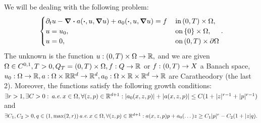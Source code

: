 \documentclass{article}
\begin{document}
We will be dealing with the following problem:
\[
	\begin{cases}
		\partial_t u - \divergence{a\qty(\vdot, u, \grad u)}+ a_0\qty(\vdot, u, \grad u) = f &\, \text{in} \, (0,T) \times \Omega, \\
		u = u_0, &\, \text{on} \, \{0\} \times \Omega, \\
		u = 0, &\, \text{on} \, (0,T) \times \partial \Omega
	\end{cases}.
\]
The unknown is the function $u: \qty(0,T) \times \Omega \to {\mathbb R},$ and we are given $\Omega \in C^{0,1}, T>0, Q_T = (0,T) \times \Omega, f: Q \to {\mathbb R}$ or $f: \qty(0,T) \to X$ a Banach space, $u_0: \Omega \to {\mathbb R}, a: \Omega \times {\mathbb R} {\mathbb R}^{d} \to {\mathbb R}^{d}, a_0: \Omega \times {\mathbb R} \times {\mathbb R}^{d}\to {\mathbb R}$ are Caratheodory (the last 2). Moreover, the functions satisfy the following growth conditions: $ \exists r >1, \exists C > 0: \, \text{\textit{a.e.}} \, x \in \Omega, \forall (z,p) \in {\mathbb R}^{d+1}: |a_0(x,z,p)|+|a(x,z,p)| \leq C(1+|z|^{r-1}+|p|^{r-1})$ and $\exists C_1, C_2>0, q \in (1, \max(2,r)) \, \text{\textit{a.e.}} \,x \in \Omega, \forall (z,p) \in {\mathbb R}^{d+1}: a\qty(x,z,p)p + a_0(\dots) z \geq C_1 |p|^r - C_2(1+|z|q).$
\end{document}
